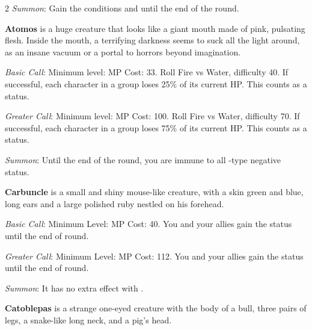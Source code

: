 \begin{multicols}{2}
    \textit{Summon}: Gain the conditions  and   until the end of the round. 

    \ffcrystal[type=level,height=8pt]
    
    \textbf{Atomos} is a huge creature that looks like a giant mouth made of pink, pulsating flesh. Inside the mouth, a terrifying darkness seems to suck all the light around, as an insane vacuum or a portal to horrors beyond imagination.
    
    \textit{Basic Call}: Minimum level:  MP Cost: 33. Roll Fire vs Water, difficulty 40. If successful, each character in a group loses 25\% of its current HP\@. This counts as a  status.
    
    \textit{Greater Call}: Minimum level:  MP Cost: 100. Roll Fire vs Water, difficulty 70. If successful, each character in a group loses 75\% of its current HP\@. This counts as a  status.
    
    \textit{Summon}: Until the end of the round, you are immune to all -type negative status.

    \ffcrystal[type=level,height=8pt]
    
    \textbf{Carbuncle} is a small and shiny mouse-like creature, with a skin green and blue, long ears and a large polished ruby nestled on his forehead.
    
    \textit{Basic Call}: Minimum Level:  MP Cost: 40. You and your allies gain the  status until the end of round.
    
    \textit{Greater Call}: Minimum Level:  MP Cost: 112. You and your allies gain the  status until the end of round.
    
    \textit{Summon}: It has no extra effect with .

    \ffcrystal[type=level,height=8pt]
    
    \textbf{Catoblepas} is a strange one-eyed creature with the body of a bull, three pairs of legs, a snake-like long neck, and a pig's head.
    

\end{multicols}
